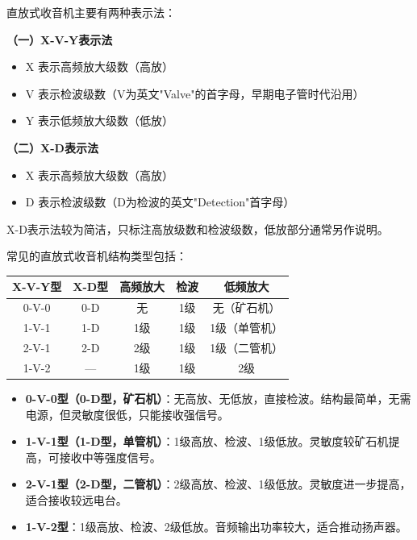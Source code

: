 \documentclass[12pt,UTF8]{ctexbook}
\begin{document}
直放式收音机主要有两种表示法：

\textbf{（一）X-V-Y表示法}

\begin{itemize}[leftmargin=3.5em]
	\item X 表示高频放大级数（高放）
	\item V 表示检波级数（V为英文"Valve"的首字母，早期电子管时代沿用）
	\item Y 表示低频放大级数（低放）
\end{itemize}

\textbf{（二）X-D表示法}

\begin{itemize}[leftmargin=3.5em]
	\item X 表示高频放大级数（高放）
	\item D 表示检波级数（D为检波的英文"Detection"首字母）
\end{itemize}

X-D表示法较为简洁，只标注高放级数和检波级数，低放部分通常另作说明。

常见的直放式收音机结构类型包括：

\begin{center}
	\begin{tabular}{|c|c|c|c|c|}
		\hline
		\textbf{X-V-Y型} & \textbf{X-D型} & \textbf{高频放大} & \textbf{检波} & \textbf{低频放大} \\
		\hline
		0-V-0 & 0-D & 无 & 1级 & 无（矿石机） \\
		\hline
		1-V-1 & 1-D & 1级 & 1级 & 1级（单管机） \\
		\hline
		2-V-1 & 2-D & 2级 & 1级 & 1级（二管机） \\
		\hline
		1-V-2 & — & 1级 & 1级 & 2级 \\
		\hline
	\end{tabular}
\end{center}

\begin{itemize}[leftmargin=3.5em]
	\item \textbf{0-V-0型（0-D型，矿石机）}：无高放、无低放，直接检波。结构最简单，无需电源，但灵敏度很低，只能接收强信号。
	\item \textbf{1-V-1型（1-D型，单管机）}：1级高放、检波、1级低放。灵敏度较矿石机提高，可接收中等强度信号。
	\item \textbf{2-V-1型（2-D型，二管机）}：2级高放、检波、1级低放。灵敏度进一步提高，适合接收较远电台。
	\item \textbf{1-V-2型}：1级高放、检波、2级低放。音频输出功率较大，适合推动扬声器。
\end{itemize}
\end{document}
